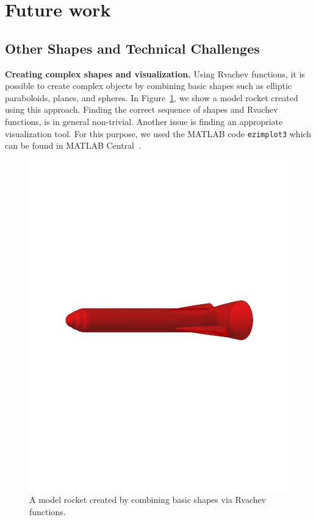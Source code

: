 \documentclass[11pt]{amsart}
\theoremstyle{definition}
\begin{document}
\section{Future work}
\subsection{Other Shapes and Technical Challenges}

\textbf{Creating complex shapes and visualization.}
Using Rvachev functions, it is possible to create 
complex objects by combining basic shapes such as elliptic paraboloids, 
planes, and spheres. In Figure~\ref{fig:rocket}, we show a model rocket created
using this approach. Finding the correct sequence of shapes and Rvachev
functions, is in general non-trivial. Another issue is finding 
an appropriate visualization tool. For this purpose, 
we used the MATLAB code \verb+ezimplot3+ which can be 
found in MATLAB Central~\cite{Morales}.

\begin{figure} 
\centerline{\includegraphics[width=.7\textwidth]{rocket.pdf}} 
\caption{A model rocket created by combining basic shapes via Rvachev
functions.}
\label{fig:rocket} 
\end{figure} 
\end{document}
